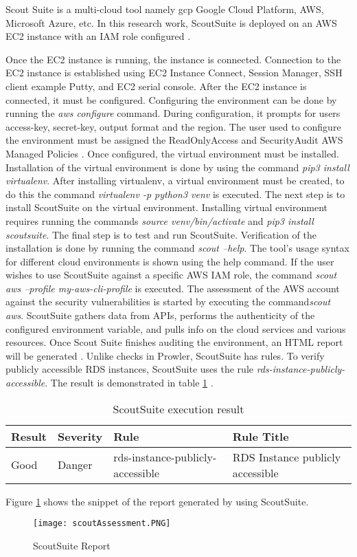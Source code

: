 \par Scout Suite is a multi-cloud tool namely \gls{gcp}
Google Cloud Platform, AWS, Microsoft Azure, etc.
In this research work, ScoutSuite is deployed on an AWS EC2 instance with an
IAM role configured \cite{87}.

\par Once the EC2 instance is running, the instance is connected.
Connection to the EC2 instance is established using EC2 Instance Connect, Session Manager, SSH client example Putty, and EC2 serial console.
After the EC2 instance is connected, it must be configured.
Configuring the environment can be done by running the
\textit{aws configure} command.
During configuration, it prompts for users access-key,
secret-key, output format and the region.
The user used to configure the environment must
be assigned the
ReadOnlyAccess and SecurityAudit AWS Managed Policies
\cite{87}.
Once configured, the virtual environment must be installed.
Installation of the virtual environment is done by using the command \textit{pip3 install virtualenv}.
After installing virtualenv, a virtual environment must be created, to do this the command \textit{virtualenv -p python3 venv} is executed.
The next step is to install ScoutSuite on the virtual environment.
Installing virtual environment requires running the commands \textit{source venv/bin/activate} and \textit{pip3 install scoutsuite}.
The final step is to test and run ScoutSuite.
Verification of the installation is done by running the command \textit{scout --help}.
The tool's usage syntax for different cloud environments is shown using the help command.
If the user wishes to use ScoutSuite against a specific
AWS IAM role, the command \textit{scout aws --profile my-aws-cli-profile} is executed.
The assessment of the AWS account against the security
vulnerabilities is started by executing the command\textit{scout aws}.
ScoutSuite gathers data from APIs, performs the authenticity of the configured environment variable, and pulls info on the cloud services and various resources.
Once Scout Suite finishes auditing the environment, an
HTML report will be generated \cite{87}.
Unlike checks in Prowler, ScoutSuite has rules.
To verify publicly accessible RDS instances, ScoutSuite uses the rule \textit{rds-instance-publicly-accessible}.
The result is demonstrated in table
\ref{tab:scoutsuiterule} \cite{88}.

\begin{table}[h!]
    \begin{center}
        \caption{ScoutSuite execution result}
        \label{tab:scoutsuiterule}
        \begin{tabular}{|p{1.4cm}|p{1.7cm}|p{5.0cm}|p{6.0cm}|}
            \hline
            \textbf{Result} & \textbf{Severity} & \textbf{Rule} & \textbf{Rule Title}\\
            \hline
            Good & Danger & rds-instance-publicly-accessible & RDS Instance publicly accessible \\
            \hline
        \end{tabular}
    \end{center}
\end{table}


Figure \ref{fig:deployscoutsuite} shows the snippet of
the report generated by using ScoutSuite.

\begin{figure}
    \centering
    \texttt{[image: scoutAssessment.PNG]}
    \caption{ScoutSuite Report}
    \label{fig:deployscoutsuite}
\end{figure}